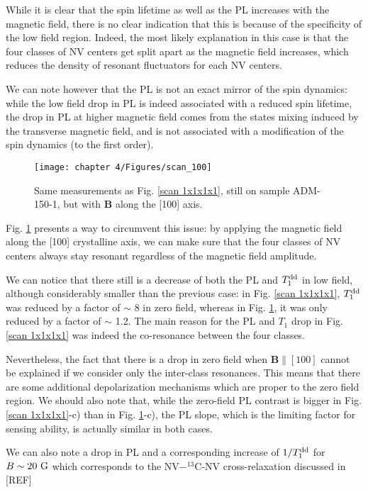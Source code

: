 \documentclass[a4paper,11pt]{report}
\begin{document}
\begin{refsection}
While it is clear that the spin lifetime as well as the PL increases with the magnetic field, there is no clear indication that this is because of the specificity of the low field region. Indeed, the most likely explanation in this case is that the four classes of NV centers get split apart as the magnetic field increases, which reduces the density of resonant fluctuators for each NV centers. 

We can note however that the PL is not an exact mirror of the spin dynamics: while the low field drop in PL is indeed associated with a reduced spin lifetime, the drop in PL at higher magnetic field comes from the states mixing induced by the transverse magnetic field, and is not associated with a modification of the spin dynamics (to the first order).

\begin{figure}[h]
\centering
\texttt{[image: chapter 4/Figures/scan\_100]}
\caption{Same measurements as Fig. \ref{scan 1x1x1x1}, still on sample ADM-150-1, but with $\mathbf{B}$ along the [100] axis.}
\label{scan 100}
\end{figure}

Fig. \ref{scan 100} presents a way to circumvent this issue: by applying the magnetic field along the [100] crystalline axis, we can make sure that the four classes of NV centers always stay resonant regardless of the magnetic field amplitude.

We can notice that there still is a decrease of both the PL and $T_1^{\rm dd}$ in low field, although considerably smaller than the previous case: in Fig. \ref{scan 1x1x1x1}, $T_1^{\rm dd}$ was reduced by a factor of $\sim$ 8 in zero field, whereas in Fig. \ref{scan 100}, it was only reduced by a factor of $\sim$ 1.2. The main reason for the PL and $T_1$ drop in Fig. \ref{scan 1x1x1x1} was indeed the co-resonance between the four classes.

Nevertheless, the fact that there is a drop in zero field when $\mathbf{B} \parallel [100]$ cannot be explained if we consider only the inter-class resonances. This means that there are some additional depolarization mechanisms which are proper to the zero field region. We should also note that, while the zero-field PL contrast is bigger in Fig. \ref{scan 1x1x1x1}-c) than in Fig. \ref{scan 100}-c), the PL slope, which is the limiting factor for sensing ability, is actually similar in both cases.

We can also note a drop in PL and a corresponding increase of $1/T_1^{\rm dd}$ for $B \sim 20\ \rm G$ which corresponds to the NV$-^{13}$C-NV cross-relaxation discussed in [REF]


\end{refsection}
\end{document}
